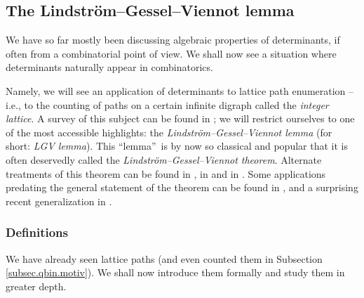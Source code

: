 \subsection{\label{sec.det.comb.lgv}The Lindstr\"{o}m--Gessel--Viennot lemma}

We have so far mostly been discussing algebraic properties of determinants, if
often from a combinatorial point of view. We shall now see a situation where
determinants naturally appear in combinatorics.

Namely, we will see an application of determinants to lattice path enumeration
-- i.e., to the counting of paths on a certain infinite digraph called the
\emph{integer lattice}. A survey of this subject can be found in
\cite{Kratte17}; we will restrict ourselves to one of the most accessible
highlights: the \emph{Lindstr\"{o}m--Gessel--Viennot lemma} (for short:
\emph{LGV lemma}). This \textquotedblleft lemma\textquotedblright\ is by now
so classical and popular that it is often deservedly called the
\emph{Lindstr\"{o}m--Gessel--Viennot theorem}. Alternate treatments of this
theorem can be found in \cite[\S 2.5]{Sagan19}, in \cite[\S 2.7]{Stanley-EC1}
and in \cite[\S 2]{GesVie89}. Some applications predating the general
statement of the theorem can be found in \cite{GesVie85}, and a surprising
recent generalization in \cite[Theorem 2.5]{Talask12}.

\subsubsection{Definitions}

We have already seen lattice paths (and even counted them in Subsection
\ref{subsec.qbin.motiv}). We shall now introduce them formally and study them
in greater depth.

\Needspace{20pc}

